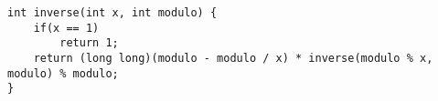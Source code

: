 \begin{lstlisting}
int inverse(int x, int modulo) {
	if(x == 1)
		return 1;
	return (long long)(modulo - modulo / x) * inverse(modulo % x, modulo) % modulo;
}
\end{lstlisting}
